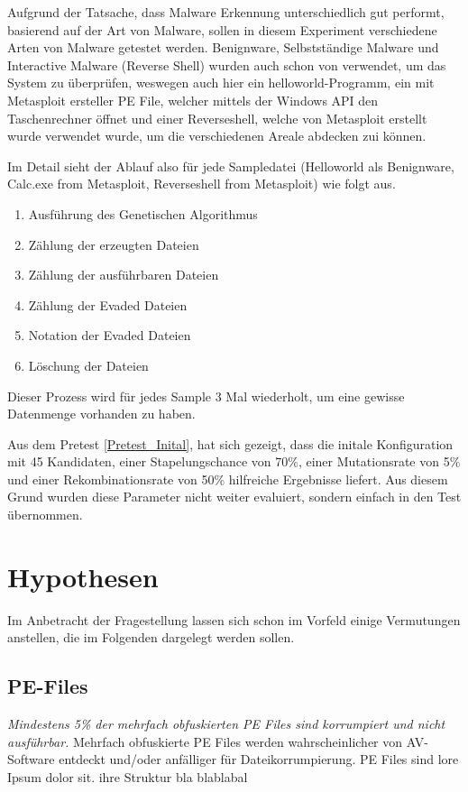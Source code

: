 Aufgrund der Tatsache, dass Malware Erkennung unterschiedlich gut performt, basierend auf der Art von Malware, sollen in diesem Experiment verschiedene Arten von Malware getestet werden. Benignware, Selbstständige Malware und Interactive Malware (Reverse Shell) wurden auch schon von \cite{holm_2023_hide} verwendet, um das System zu überprüfen, weswegen auch hier ein helloworld-Programm, ein mit Metasploit ersteller PE File, welcher mittels der Windows API den Taschenrechner öffnet und einer Reverseshell, welche von Metasploit erstellt wurde verwendet wurde, um die verschiedenen Areale abdecken zui können.

Im Detail sieht der Ablauf also für jede Sampledatei (Helloworld als Benignware, Calc.exe from Metasploit, Reverseshell from Metasploit) wie folgt aus.
\begin{enumerate}
    \item Ausführung des Genetischen Algorithmus
    \item Zählung der erzeugten Dateien
    \item Zählung der ausführbaren Dateien
    \item Zählung der Evaded Dateien
    \item Notation der Evaded Dateien
    \item Löschung der Dateien
\end{enumerate}
Dieser Prozess wird für jedes Sample 3 Mal wiederholt, um eine gewisse Datenmenge vorhanden zu haben.

Aus dem Pretest \ref{Pretest_Inital}, hat sich gezeigt, dass die initale Konfiguration mit 45 Kandidaten, einer Stapelungschance von 70\%, einer Mutationsrate von 5\% und einer Rekombinationsrate von 50\% hilfreiche Ergebnisse liefert. Aus diesem Grund wurden diese Parameter nicht weiter evaluiert, sondern einfach in den Test übernommen.

\section{Hypothesen}
Im Anbetracht der Fragestellung lassen sich schon im Vorfeld einige Vermutungen anstellen, die im Folgenden dargelegt werden sollen.
\subsection{PE-Files}
\textit{Mindestens 5\% der mehrfach obfuskierten PE Files sind korrumpiert und nicht ausführbar.}
Mehrfach obfuskierte PE Files werden wahrscheinlicher von AV-Software entdeckt und/oder anfälliger für Dateikorrumpierung.
PE Files sind lore Ipsum dolor sit. ihre Struktur bla blablabal
